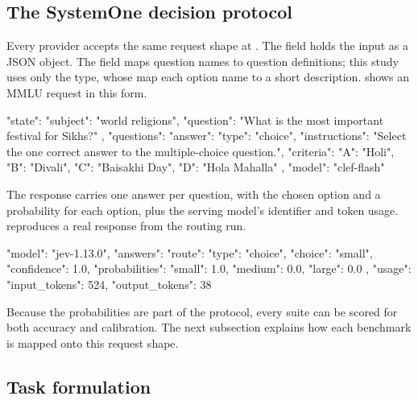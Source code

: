 \documentclass[11pt,a4paper]{article}
\begin{document}
\subsection{The SystemOne decision protocol}\label{sec:protocol}

Every provider accepts the same request shape at . The  field
holds the input as a JSON object. The  field maps question names to question
definitions; this study uses only the  type, whose  map each option name to
a short description.  shows an MMLU request in this form.

\begin{brandcode}[lang=json, caption={An MMLU request in SystemOne form. Options are shown in A--D order; the harness shuffles them per case before sending\label{code:request}}]
{
  "state": {
    "subject": "world religions",
    "question": "What is the most important festival for Sikhs?"
  },
  "questions": {
    "answer": {
      "type": "choice",
      "instructions": "Select the one correct answer to the multiple-choice question.",
      "criteria": {"A": "Holi", "B": "Divali", "C": "Baisakhi Day", "D": "Hola Mahalla"}
    }
  },
  "model": "clef-flash"
}
\end{brandcode}

The response carries one answer per question, with the chosen option and a probability for each
option, plus the serving model's identifier and token usage.  reproduces a real
response from the routing run.

\begin{brandcode}[lang=json, caption={A saved Jev response to routing case small-001, a title-case conversion request\label{code:response}}]
{
  "model": "jev-1.13.0",
  "answers": {
    "route": {
      "type": "choice", "choice": "small", "confidence": 1.0,
      "probabilities": {"small": 1.0, "medium": 0.0, "large": 0.0}
    }
  },
  "usage": {"input_tokens": 524, "output_tokens": 38}
}
\end{brandcode}

Because the probabilities are part of the protocol, every suite can be scored for both accuracy and
calibration. The next subsection explains how each benchmark is mapped onto this request shape.

\subsection{Task formulation}\label{sec:suites}
\end{document}

